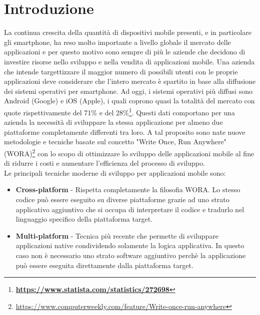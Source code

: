 
\section{Introduzione}
La continua crescita della quantità di dispositivi mobile presenti, e in particolare gli smartphone, ha reso molto importante a livello globale il mercato delle applicazioni e per questo motivo sono sempre di più le aziende che decidono di investire risorse nello sviluppo e nella vendita di applicazioni mobile. Una azienda che intende targettizzare il maggior numero di possibili utenti con le proprie applicazioni deve considerare che l'intero mercato è spartito in base alla diffusione dei sistemi operativi per smartphone. Ad oggi, i sistemi operativi più diffusi sono Android (Google) e iOS (Apple), i quali coprono quasi la totalità del mercato con quote rispettivamente del 71\% e del 28\%\footnote{\href{https://www.statista.com/statistics/272698/global-market-share-held-by-mobile-operating-systems-since-2009/}{\textbf{https://www.statista.com/statistics/272698}}}. Questi dati comportano per una azienda la necessità di sviluppare la stessa applicazione per almeno due piattaforme completamente differenti tra loro. A tal proposito sono nate nuove metodologie e tecniche basate sul concetto "Write Once, Run Anywhere" (WORA)\footnote{\url{https://www.computerweekly.com/feature/Write-once-run-anywhere}} con lo scopo di ottimizzare lo sviluppo delle applicazioni mobile al fine di ridurre i costi e aumentare l'efficienza del processo di sviluppo.\\
Le principali tecniche moderne di sviluppo per applicazioni mobile sono:
\begin{itemize}
    \item \textbf{Cross-platform} - Rispetta completamente la filosofia WORA. Lo stesso codice può essere eseguito su diverse piattaforme grazie ad uno strato applicativo aggiuntivo che si occupa di interpretare il codice e tradurlo nel linguaggio specifico della piattaforma target.
    \item \textbf{Multi-platform} - Tecnica più recente che permette di sviluppare applicazioni native condividendo solamente la logica applicativa. In questo caso non è necessario uno strato software aggiuntivo perchè la applicazione può essere eseguita direttamente dalla piattaforma target.
\end{itemize}

